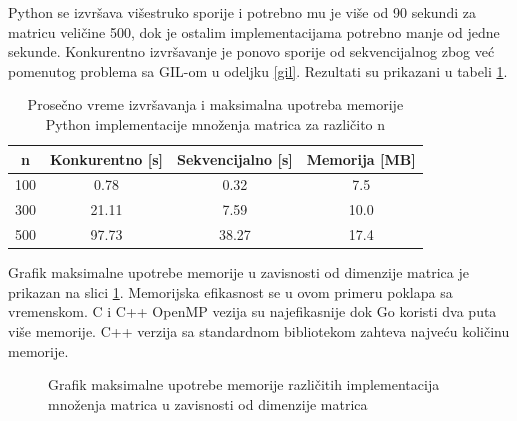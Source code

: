 \documentclass[12pt,oneside]{memoir}
\begin{document}
Python se izvršava višestruko sporije i potrebno mu je više od 90 sekundi za matricu veličine 500, dok je ostalim implementacijama potrebno manje od jedne sekunde. Konkurentno izvršavanje je ponovo sporije od sekvencijalnog zbog već pomenutog problema sa GIL-om u odeljku \ref{gil}. Rezultati su prikazani u tabeli \ref{tab:matrix1}.

\begin{table}
\begin{center}
\caption{Prosečno vreme izvršavanja i maksimalna upotreba memorije Python implementacije množenja matrica za različito n}
\begin{tabular}{||c||c|c|c||}
\hline
n & Konkurentno [s]& Sekvencijalno [s] & Memorija [MB] \\ \hline
100	&0.78	&0.32&7.5\\
300	&21.11&7.59&10.0\\
500	&97.73&38.27&17.4\\
\hline
\end{tabular}
\label{tab:matrix1}
\end{center}
\end{table}


Grafik maksimalne upotrebe memorije u zavisnosti od dimenzije matrica je prikazan na slici \ref{fig:matrix2}. Memorijska efikasnost se u ovom primeru poklapa sa vremenskom. C i C++ OpenMP vezija su najefikasnije dok Go koristi dva puta više memorije. C++ verzija sa standardnom bibliotekom zahteva najveću količinu memorije. 

\begin{figure}
\begin{center}


\caption{Grafik maksimalne upotrebe memorije različitih implementacija množenja matrica u zavisnosti od dimenzije matrica}
\label{fig:matrix2}
\end{center}
\end{figure}
\end{document}

